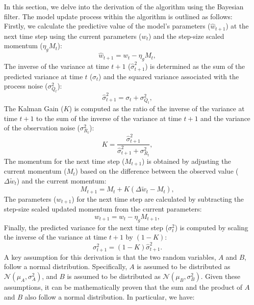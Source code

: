 In this section, we delve into the derivation of the \fedeve algorithm using the Bayesian filter. The model update process within the \fedeve algorithm is outlined as follows:
Firstly, we calculate the predictive value of the model's parameters ($\hat{w}_{t+1}$) at the next time step using the current parameters ($w_t$) and the step-size scaled momentum ($\eta_g M_t$):
\begin{equation}
   \hat{w}_{t+1}=w_t-\eta_g M_t,
\end{equation}
The inverse of the variance at time $t+1$ ($\hat{\sigma}^2_{t+1}$) is determined as the sum of the predicted variance at time $t$ ($\sigma_{t}$) and the squared variance associated with the process noise ($\sigma_{Q_t}^2$):
\begin{equation}
   \hat{\sigma}^2_{t+1}=\sigma_{t}+\sigma_{Q_t}^2,
\end{equation}
The Kalman Gain ($K$) is computed as the ratio of the inverse of the variance at time $t+1$ to the sum of the inverse of the variance at time $t+1$ and the variance of the observation noise ($\sigma_{R_t}^2$):
\begin{equation}
   K=\frac{\hat{\sigma}^2_{t+1}}{\hat{\sigma}^2_{t+1}+\sigma_{R_t}^2},
\end{equation}
The momentum for the next time step ($M_{t+1}$) is obtained by adjusting the current momentum ($M_{t}$) based on the difference between the observed value ($\Delta \tilde{w}_{t}$) and the current momentum:
\begin{equation}
   M_{t+1}= M_{t}+K(\Delta \tilde{w}_{t}-M_{t}),
\end{equation}
The parameters ($w_{t+1}$) for the next time step are calculated by subtracting the step-size scaled updated momentum from the current parameters:
\begin{equation}
   w_{t+1}=w_t-\eta_g M_{t+1},
\end{equation}
Finally, the predicted variance for the next time step (${\sigma}^2_{t}$) is computed by scaling the inverse of the variance at time $t+1$ by $(1-K)$:
\begin{equation}
   {\sigma}^2_{t+1}=(1-K)\hat{\sigma}^2_{t+1}.
\end{equation}
A key assumption for this derivation is that the two random variables, $A$ and $B$, follow a normal distribution. Specifically, $A$ is assumed to be distributed as $\mathcal{N}\left(\mu_A, \sigma_A^2\right)$, and $B$ is assumed to be distributed as $\mathcal{N}\left(\mu_B, \sigma_B^2\right)$. Given these assumptions, it can be mathematically proven that the sum and the product of $A$ and $B$ also follow a normal distribution. In particular, we have:
